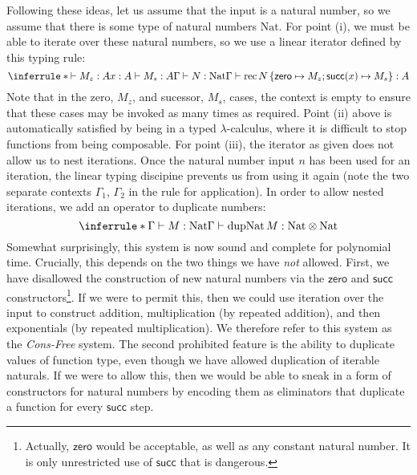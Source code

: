 \documentclass[acmsmall,review]{acmart}
\newcommand{\tmRec}{\mathrm{rec}}
\newcommand{\tyNat}{\mathrm{Nat}}
\newcommand{\conZero}{\mathsf{zero}}
\newcommand{\conSucc}{\mathsf{succ}}
\newcommand{\dupNat}{\mathrm{dupNat}}
\begin{document}
Following these ideas, let us assume that the input is a natural
number, so we assume that there is some type of natural numbers
$\tyNat$. For point (i), we must be able to iterate over these natural
numbers, so we use a linear iterator defined by this typing rule:
\begin{displaymath}
  \inferrule*
  {\vdash M_z : A \\ x : A \vdash M_s : A \\ \Gamma \vdash N : \tyNat}
  {\Gamma \vdash \tmRec\,N\,\{\conZero \mapsto M_z; \conSucc(x) \mapsto M_s\} : A}
\end{displaymath}
Note that in the zero, $M_z$, and sucessor, $M_s$, cases, the context
is empty to ensure that these cases may be invoked as many times as
required. Point (ii) above is automatically satisfied by being in a
typed $\lambda$-calculus, where it is difficult to stop functions from
being composable. For point (iii), the iterator as given does not
allow us to nest iterations. Once the natural number input $n$ has
been used for an iteration, the linear typing discipine prevents us
from using it again (note the two separate contexts $\Gamma_1$,
$\Gamma_2$ in the rule for application). In order to allow nested
iterations, we add an operator to duplicate numbers:
\begin{displaymath}
  \inferrule*
  {\Gamma \vdash M : \tyNat}
  {\Gamma \vdash \dupNat\,M : \tyNat \otimes \tyNat}
\end{displaymath}
Somewhat surprisingly, this system is now sound and complete for
polynomial time. Crucially, this depends on the two things we have
\emph{not} allowed. First, we have disallowed the construction of new
natural numbers via the $\conZero$ and $\conSucc$
constructors\footnote{Actually, $\conZero$ would be acceptable, as
  well as any constant natural number. It is only unrestricted use of
  $\conSucc$ that is dangerous.}. If we were to permit this, then we
could use iteration over the input to construct addition,
multiplication (by repeated addition), and then exponentials (by
repeated multiplication). We therefore refer to this system as the
\emph{Cons-Free} system.  The second prohibited feature is the ability
to duplicate values of function type, even though we have allowed
duplication of iterable naturals. If we were to allow this, then we
would be able to sneak in a form of constructors for natural numbers
by encoding them as eliminators that duplicate a function for every
$\conSucc$ step.
\end{document}
